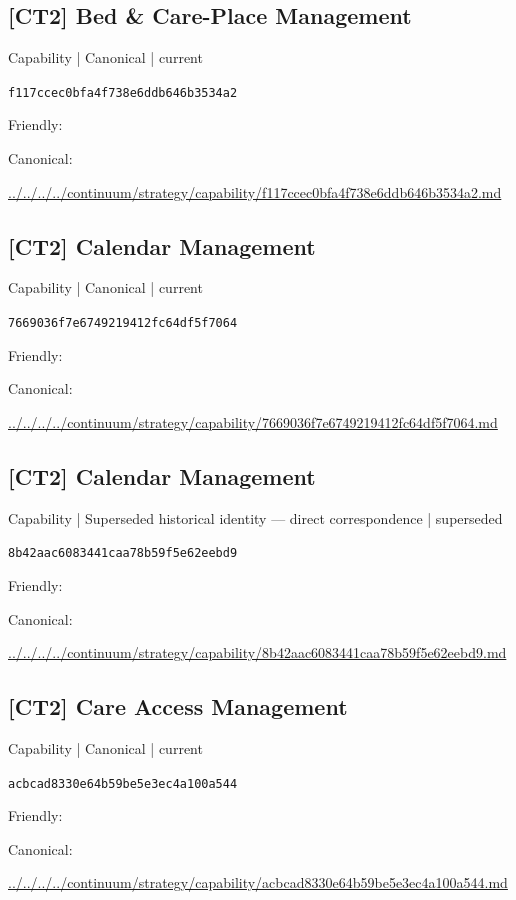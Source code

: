 \documentclass[10pt,a4paper]{article}
\begin{document}
\subsection*{[CT2] Bed \& Care-Place Management}
{\small Capability | Canonical | current}\par
\texttt{f117ccec0bfa4f738e6ddb646b3534a2}\par
Friendly: \par
Canonical: \par
{\footnotesize\url{../../../../continuum/strategy/capability/f117ccec0bfa4f738e6ddb646b3534a2.md}}\par
\subsection*{[CT2] Calendar Management}
{\small Capability | Canonical | current}\par
\texttt{7669036f7e6749219412fc64df5f7064}\par
Friendly: \par
Canonical: \par
{\footnotesize\url{../../../../continuum/strategy/capability/7669036f7e6749219412fc64df5f7064.md}}\par
\subsection*{[CT2] Calendar Management}
{\small Capability | Superseded historical identity — direct correspondence | superseded}\par
\texttt{8b42aac6083441caa78b59f5e62eebd9}\par
Friendly: \par
Canonical: \par
{\footnotesize\url{../../../../continuum/strategy/capability/8b42aac6083441caa78b59f5e62eebd9.md}}\par
\subsection*{[CT2] Care Access Management}
{\small Capability | Canonical | current}\par
\texttt{acbcad8330e64b59be5e3ec4a100a544}\par
Friendly: \par
Canonical: \par
{\footnotesize\url{../../../../continuum/strategy/capability/acbcad8330e64b59be5e3ec4a100a544.md}}\par
\end{document}
